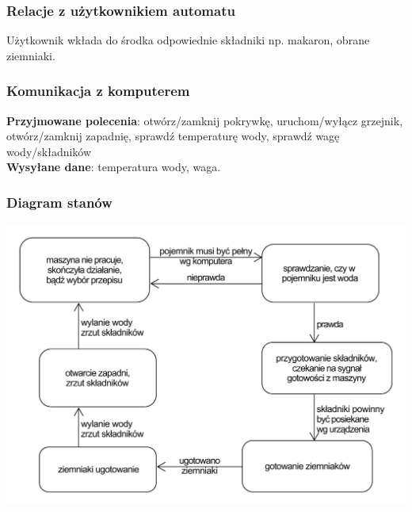 \documentclass[12pt,a4paper,notitlepage]{article}
\begin{document}
\subsubsection{Relacje z użytkownikiem automatu}
Użytkownik wkłada do środka odpowiednie składniki np. makaron, obrane ziemniaki.

\subsubsection{Komunikacja z komputerem}
\textbf{Przyjmowane polecenia}: otwórz/zamknij pokrywkę, uruchom/wyłącz grzejnik, otwórz/zamknij zapadnię, sprawdź temperaturę wody, sprawdź wagę wody/składników\\
\textbf{Wysyłane dane}: temperatura wody, waga.

\subsubsection{Diagram stanów}
\includegraphics[width=\textwidth,height=\textheight,keepaspectratio=true]{Diagram-stanow-pojemnik-na-ziemniaki.pdf}
\end{document}
